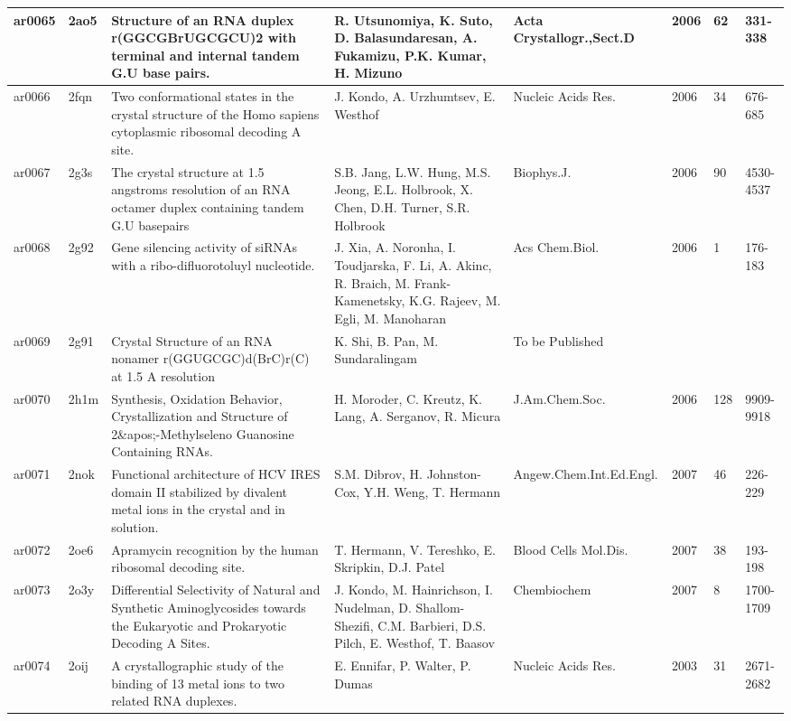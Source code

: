 {\begin{landscape}
\begin{center}
\begin{longtable}{p{0.76cm}   p{0.74cm}  p{5.2cm}   p{5.2cm}  p{3.2cm}
    p{0.6cm} p{0.9cm} p{1.8cm}}
ar0065 & 2ao5 & Structure of an RNA duplex r(GGCGBrUGCGCU)2 with terminal and internal tandem G.U base pairs. & R. Utsunomiya, K. Suto, D. Balasundaresan, A. Fukamizu, P.K. Kumar, H. Mizuno & Acta Crystallogr.,Sect.D & 2006 & 62 & 331-338 \\ \hline
ar0066 & 2fqn & Two conformational states in the crystal structure of the Homo sapiens cytoplasmic ribosomal decoding A site. & J. Kondo, A. Urzhumtsev, E. Westhof & Nucleic Acids Res. & 2006 & 34 & 676-685 \\ \hline
ar0067 & 2g3s & The crystal structure at 1.5 angstroms resolution of an RNA octamer duplex containing tandem G.U basepairs & S.B. Jang, L.W. Hung, M.S. Jeong, E.L. Holbrook, X. Chen, D.H. Turner, S.R. Holbrook & Biophys.J. & 2006 & 90 & 4530-4537 \\ \hline
ar0068 & 2g92 & Gene silencing activity of siRNAs with a ribo-difluorotoluyl nucleotide. & J. Xia, A. Noronha, I. Toudjarska, F. Li, A. Akinc, R. Braich, M. Frank-Kamenetsky, K.G. Rajeev, M. Egli, M. Manoharan & Acs Chem.Biol. & 2006 & 1 & 176-183 \\ \hline
ar0069 & 2g91 & Crystal Structure of an RNA nonamer r(GGUGCGC)d(BrC)r(C) at 1.5 A resolution & K. Shi, B. Pan, M. Sundaralingam & To be Published & \multicolumn{1}{l}{} & \multicolumn{1}{l}{} &   \\ \hline
ar0070 & 2h1m & Synthesis, Oxidation Behavior, Crystallization and Structure of 2\&apos;-Methylseleno Guanosine Containing RNAs. & H. Moroder, C. Kreutz, K. Lang, A. Serganov, R. Micura & J.Am.Chem.Soc. & 2006 & 128 & 9909-9918 \\ \hline
ar0071 & 2nok & Functional architecture of HCV IRES domain II stabilized by divalent metal ions in the crystal and in solution. & S.M. Dibrov, H. Johnston-Cox, Y.H. Weng, T. Hermann & Angew.Chem.Int.Ed.Engl. & 2007 & 46 & 226-229 \\ \hline
ar0072 & 2oe6 & Apramycin recognition by the human ribosomal decoding site. & T. Hermann, V. Tereshko, E. Skripkin, D.J. Patel & Blood Cells Mol.Dis. & 2007 & 38 & 193-198 \\ \hline
ar0073 & 2o3y & Differential Selectivity of Natural and Synthetic Aminoglycosides towards the Eukaryotic and Prokaryotic Decoding A Sites. & J. Kondo, M. Hainrichson, I. Nudelman, D. Shallom-Shezifi, C.M. Barbieri, D.S. Pilch, E. Westhof, T. Baasov & Chembiochem & 2007 & 8 & 1700-1709 \\ \hline
ar0074 & 2oij & A crystallographic study of the binding of 13 metal ions to two related RNA duplexes. & E. Ennifar, P. Walter, P. Dumas & Nucleic Acids Res. & 2003 & 31 & 2671-2682 \\ \hline

\end{longtable}
\end{center}
\end{landscape}}
